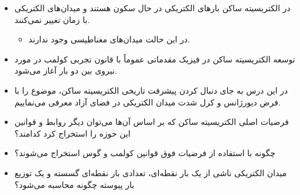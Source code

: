 \ELhold


\begin{ELunit}


\end{ELunit}

\ELhold


\begin{ELunit}

\begin{itemize}
\tightlist
\item
  در الکتریسیته ساکن بارهای الکتریکی در حال سکون هستند و میدان‌های الکتریکی با زمان تغییر نمی‌کنند.

  \begin{itemize}
  \tightlist
  \item
    در این حالت میدان‌های مغناطیسی وجود ندارند.
  \end{itemize}
\item
  توسعه الکتریسیته ساکن در فیزیک مقدماتی عموماً با قانون تجربی کولمب در مورد نیروی بین دو بار آغاز می‌شود.
\item
  در این درس به جای دنبال کردن پیشرفت تاریخی الکتریسیته ساکن، موضوع را با فرض دیورژانس و کرل شدت میدان الکتریکی در فضای آزاد معرفی می‌نماییم.
\end{itemize}


\begin{itemize}
\tightlist
\item
  فرضیات اصلی الکتریسیته ساکن که بر اساس آن‌ها می‌توان دیگر روابط و قوانین این حوزه را استخراج کرد کدامند؟
\item
  چگونه با استفاده از فرضیات فوق قوانین کولمب و گوس استخراج می‌شوند؟
\item
  میدان الکتریکی ناشی از یک بار نقطه‌ای، تعدادی بار نقطه‌ای گسسته و یک توزیع بار پیوسته چگونه محاسبه می‌شود؟
\end{itemize}

\end{ELunit}

\ELhold


